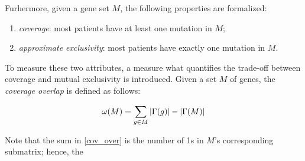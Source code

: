 Furhermore, given a gene set $M$, the following properties are formalized:

\begin{enumerate}[label=\roman*), font=\itshape]
    \item \textit{coverage}: most patients have at least one mutation in $M$;
    \item \textit{approximate exclusivity}: most patients have exactly one mutation in $M$.
\end{enumerate}

To measure these two attributes, a measure what quantifies the trade-off between coverage and mutual exclusivity is introduced. Given a set $M$ of genes, the \textit{coverage overlap} is defined as follows:

\begin{equation}\label{cov_over}
    \omega(M) = \sum_{g \in M}{\left|\Gamma(g)\right|} - \left|\Gamma(M)\right|
\end{equation}

Note that the sum in \cref{cov_over} is the number of 1s in $M$'s corresponding submatrix; hence, the 

\cleardoublepage
